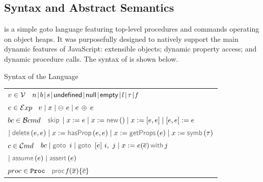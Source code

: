 \vspace*{-0.2cm}
\subsection{\jsil Syntax and Abstract Semantics}\label{subsec:jsil:analysis:formalism}

\vspace*{-0.1cm}
 \jsil is a simple goto language featuring top-level procedures and commands operating on object heaps. It was purposefully designed to natively support the main dynamic features of JavaScript: extensible objects; dynamic property access; and dynamic procedure calls. The syntax of \jsil is shown below. 

\vspace{5pt}
\begin{display}{Syntax of the \jsil Language}{
\begin{tabular}{l}
$v \in \mathcal{V}$ \ $\jnumber \! \mid \! \jbool \! \mid \! \jstring \! \mid \! {\small \jundefined} \! \mid \! {\small \jnull} \! \mid \! {\small \jempty} \! \mid \! \loc \! \mid \! \jtype \! \mid \!  \pid$
   \\[0.1cm]
  $e \in \mathcal{E}xp$ \ $\val \mid \jvar \mid \ominus\ \jsilexpr \mid \jsilexpr \binop{} \jsilexpr$
 \\[0.1cm]
%
$bc \in \mathcal{B}cmd$ \ $\jsilskip \mid \jvar := \jsilexpr  \mid \jvar := \jsilnew() \mid \jvar := [\jsilexpr, \jsilexpr] \mid [\jsilexpr, \jsilexpr] := \jsilexpr $ \\
%
\hspace{0.02cm} $\mid \jsildelete(\jsilexpr, \jsilexpr) \mid \jvar := \hasfield(\jsilexpr, \jsilexpr) \mid \jvar := \getfields(\jsilexpr) \mid \jvar := \makesymbolic(\jtype)$ \\[0.1cm]
$c \in \mathcal{C}md$  \ $ \bcmd \mid \goto \ i \mid  \ifgoto{\jsilexpr}{i}{j} \mid \jsilcall{\jvar}{\jsilexpr}{\jvec{\jsilexpr}}{j}$ \\
\hspace{0.02cm} $ \mid \assume(\jsilexpr) \mid \assert(\jsilexpr)$ \\[0.1cm]
%
$proc \in \mathtt{Proc}$  \ $\procedure{\pid}{\jvec{\jvar}}{\jvec{\jcmd}}$
 \end{tabular}}
\end{display}

